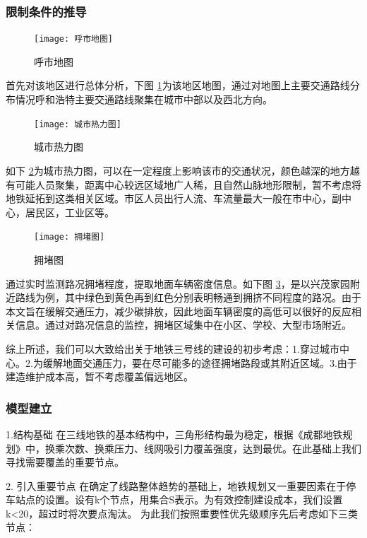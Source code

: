 \documentclass[12pt,a4paper]{mcmthesis}
\begin{document}
    \subsubsection{限制条件的推导}
    \begin{figure}[h!t]
        \centerline{\texttt{[image: 呼市地图]}\quad
        }
        \caption{\song\wuhao
        呼市地图}
        \label{fig:呼市地图}
    \end{figure}
    首先对该地区进行总体分析，下图 \ref{fig:呼市地图}为该地区地图，通过对地图上主要交通路线分布情况呼和浩特主要交通路线聚集在城市中部以及西北方向。
    \begin{figure}[h!t]
        \centerline{\texttt{[image: 城市热力图]}\quad
        }
        \caption{\song\wuhao
        城市热力图}
        \label{fig:城市热力图}
    \end{figure}
    如下 \ref{fig:城市热力图}为城市热力图，可以在一定程度上影响该市的交通状况，颜色越深的地方越有可能人员聚集，距离中心较远区域地广人稀，且自然山脉地形限制，暂不考虑将地铁延拓到这类相关区域。市区人员出行人流、车流量最大一般在市中心，副中心，居民区，工业区等。
    \begin{figure}[h!t]
        \centerline{\texttt{[image: 拥堵图]}\quad
        }
        \caption{\song\wuhao
        拥堵图}
        \label{fig:拥堵图}
    \end{figure}


    通过实时监测路况拥堵程度，提取地面车辆密度信息。如下图 \ref{fig:拥堵图}，是以兴茂家园附近路线为例，其中绿色到黄色再到红色分别表明畅通到拥挤不同程度的路况。由于本文旨在缓解交通压力，减少碳排放，因此地面车辆密度的高低可以很好的反应相关信息。通过对路况信息的监控，拥堵区域集中在小区、学校、大型市场附近。

    综上所述，我们可以大致给出关于地铁三号线的建设的初步考虑：1.穿过城市中心。2.为缓解地面交通压力，要在尽可能多的途径拥堵路段或其附近区域。3.由于建造维护成本高，暂不考虑覆盖偏远地区。

    \subsubsection{模型建立}
    1.结构基础
    在三线地铁的基本结构中，三角形结构最为稳定，根据《成都地铁规划》中，换乘次数、换乘压力、线网吸引力覆盖强度，达到最优。在此基础上我们寻找需要覆盖的重要节点。

    2. 引入重要节点
    在确定了线路整体趋势的基础上，地铁规划又一重要因素在于停车站点的设置。设有k个节点，用集合S表示。为有效控制建设成本，我们设置k<20，超过时将次要点淘汰。
    为此我们按照重要性优先级顺序先后考虑如下三类节点：
\end{document}
